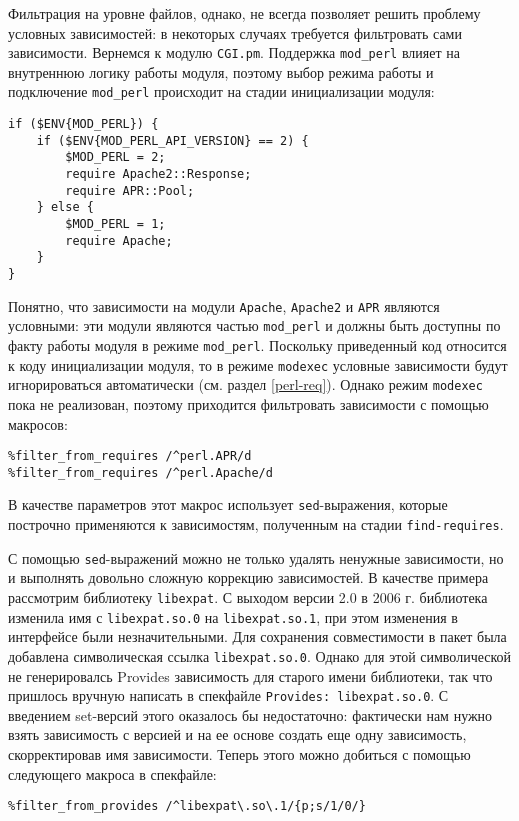 \documentclass[russian,a4paper,12pt,titlepage]{article}
\begin{document}
Фильтрация на уровне файлов, однако, не всегда позволяет решить проблему условных зависимостей: в некоторых
случаях требуется фильтровать сами зависимости.  Вернемся к модулю \verb|CGI.pm|.  Поддержка \verb|mod_perl|
влияет на внутреннюю логику работы модуля, поэтому выбор режима работы и подключение \verb|mod_perl| происходит
на стадии инициализации модуля:
\begin{verbatim}
if ($ENV{MOD_PERL}) {
    if ($ENV{MOD_PERL_API_VERSION} == 2) {
        $MOD_PERL = 2;
        require Apache2::Response;
        require APR::Pool;
    } else {
        $MOD_PERL = 1;
        require Apache;
    }
}
\end{verbatim}
Понятно, что зависимости на модули \verb|Apache|, \verb|Apache2| и \verb|APR| являются условными:
эти модули являются частью \verb|mod_perl| и должны быть доступны по факту работы модуля в режиме \verb|mod_perl|.
Поскольку приведенный код относится к коду инициализации модуля, то в режиме \verb|modexec| условные зависимости
будут игнорироваться автоматически (см. раздел \ref{perl-req}).  Однако режим \verb|modexec| пока не реализован,
поэтому приходится фильтровать зависимости с помощью макросов:
\begin{verbatim}
%filter_from_requires /^perl.APR/d
%filter_from_requires /^perl.Apache/d
\end{verbatim}
В качестве параметров этот макрос использует \verb|sed|-выражения, которые построчно применяются к зависимостям,
полученным на стадии \verb|find-requires|.

С помощью \verb|sed|-выражений можно не только удалять ненужные зависимости, но и выполнять довольно сложную коррекцию зависимостей.
В качестве примера рассмотрим библиотеку \verb|libexpat|.  С выходом версии 2.0 в 2006 г. библиотека изменила имя с \verb|libexpat.so.0|
на \verb|libexpat.so.1|, при этом изменения в интерфейсе были незначительными.  Для сохранения совместимости в пакет была добавлена
символическая ссылка \verb|libexpat.so.0|.  Однако для этой символической не генерировалсь Provides зависимость для старого имени
библиотеки, так что пришлось вручную написать в спекфайле \verb|Provides: libexpat.so.0|.  С введением set-версий этого оказалось
бы недостаточно: фактически нам нужно взять зависимость с версией и на ее основе создать еще одну зависимость, скорректировав
имя зависимости.  Теперь этого можно добиться с помощью следующего макроса в спекфайле:
\begin{verbatim}
%filter_from_provides /^libexpat\.so\.1/{p;s/1/0/}
\end{verbatim}
\end{document}
